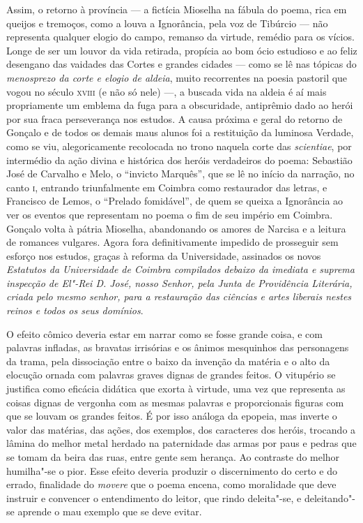 Assim, o retorno à província --- a fictícia Mioselha na fábula do poema, rica em
queijos e tremoços, como a louva a Ignorância, pela voz de Tibúrcio --- não
representa qualquer elogio do campo, remanso da virtude, remédio para os vícios.
Longe de ser um louvor da vida retirada, propícia ao bom ócio estudioso e ao
feliz desengano das vaidades das Cortes e grandes cidades --- como se lê nas
tópicas do \textit{menosprezo da corte e elogio de aldeia}, muito recorrentes na
poesia pastoril que vogou no século \textsc{xviii} (e não só nele) ---, a buscada
vida na aldeia é aí mais propriamente um emblema da fuga para a obscuridade,
antiprêmio dado ao herói por sua fraca perseverança nos estudos. A causa próxima
e geral do retorno de Gonçalo e de todos os demais maus alunos foi a restituição
da luminosa Verdade, como se viu, alegoricamente recolocada no trono naquela
corte das \textit{scientiae}, por intermédio da ação divina e histórica dos
heróis verdadeiros do poema: Sebastião José de Carvalho e Melo, o ``invicto
Marquês'', que se lê no início da narração, no canto \textsc{i}, entrando
triunfalmente em Coimbra como restaurador das letras, e Francisco de Lemos, o
``Prelado fomidável'', de quem se queixa a Ignorância ao ver os eventos que
representam no poema o fim de seu império em Coimbra.  Gonçalo volta à pátria
Mioselha, abandonando os amores de Narcisa e a leitura de romances vulgares.
Agora fora definitivamente impedido de prosseguir sem esforço nos estudos,
graças à reforma da Universidade, assinados os novos \textit{Estatutos da
Universidade de Coimbra compilados debaixo da imediata e suprema inspecção de
El"-Rei D. José, nosso Senhor, pela Junta de Providência Literária, criada pelo
mesmo senhor, para a restauração das ciências e artes liberais nestes reinos e
todos os seus domínios}. 

O efeito cômico deveria estar em narrar como se fosse grande coisa, e com
palavras infladas, as bravatas irrisórias e os ânimos mesquinhos das personagens
da trama, pela dissociação entre o baixo da invenção da matéria e o alto da
elocução ornada com palavras graves dignas de grandes feitos.  O vitupério se
justifica como eficácia didática que exorta à virtude, uma vez que representa as
coisas dignas de vergonha com as mesmas palavras e proporcionais figuras com que
se louvam os grandes feitos. É por isso análoga da epopeia, mas inverte o valor
das matérias, das ações, dos exemplos, dos caracteres dos heróis, trocando a
lâmina do melhor metal herdado na paternidade das armas por paus e pedras que se
tomam da beira das ruas, entre gente sem herança. Ao contraste do melhor
humilha"-se o pior. Esse efeito deveria produzir o discernimento do certo e do
errado, finalidade do \textit{movere} que o poema encena, como moralidade que
deve instruir e convencer o entendimento do leitor, que rindo deleita"-se, e
deleitando"-se aprende o mau exemplo que se deve evitar.

